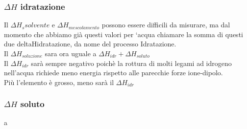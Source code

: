 \subsubsection{$\Delta H$ idratazione}
Il $\Delta H_s{solvente}$ e $\Delta H_{mescolamento}$ possono essere difficili da misurare, ma dal momento che abbiamo già questi valori per ‘acqua chiamare la somma di questi due deltaHidratazione, da nome del processo Idratazione.\\
Il $\Delta H_{soluzione}$ sara ora uguale a $\Delta H_{idr} + \Delta H_{soluto}$\\
Il $\Delta H_{idr}$ sarà sempre negativo poichè la rottura di molti legami ad idrogeno nell’acqua richiede meno energia rispetto alle parecchie forze ione-dipolo.\\
Più l’elemento è grosso, meno sarà il $\Delta H_{idr}$
\subsubsection{$\Delta H$ soluto}
a